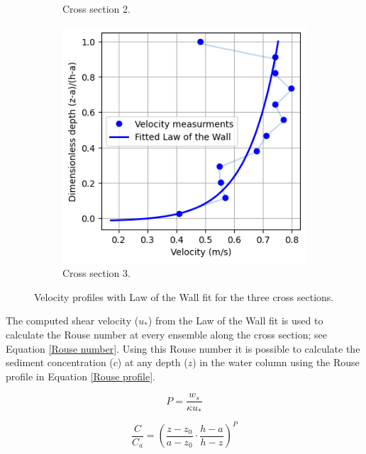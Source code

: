 \begin{figure}[H]
\begin{subfigure}[b]{0.32\linewidth}
        \caption{Cross section 2.}
    \end{subfigure}
    \hfill
    \begin{subfigure}[b]{0.32\linewidth}
        \includegraphics[width=\linewidth]{figures/ch6/cs3_vel_profile.png}
        \caption{Cross section 3.}
    \end{subfigure}
    \caption{Velocity profiles with Law of the Wall fit for the three cross sections.}
    \label{fig: Velocity profiles cross sections}
\end{figure}

The computed shear velocity ($u_*$) from the Law of the Wall fit is used to calculate the Rouse number at every ensemble along the cross section; see Equation \ref{Rouse number}. Using this Rouse number it is possible to calculate the sediment concentration ($c$) at any depth ($z$) in the water column using the Rouse profile in Equation \ref{Rouse profile}.

\begin{equation}
    P = \frac{w_s}{\kappa u_*}
    \label{Rouse number}
\end{equation}

\begin{equation}
    \frac{C}{C_a} = \left( \frac{z - z_0}{a - z_0} \cdot \frac{h - a}{h - z} \right)^{P}
    \label{Rouse profile}
\end{equation}

